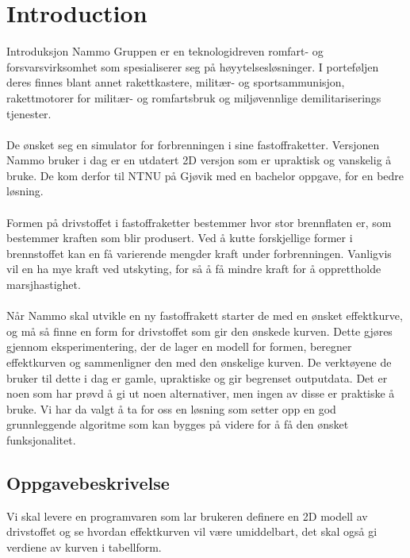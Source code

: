 \chapter{Introduction}
\label{chap:introduksjon}

Introduksjon
Nammo Gruppen er en teknologidreven romfart- og forsvarsvirksomhet som spesialiserer seg på høyytelsesløsninger. I porteføljen deres finnes blant annet rakettkastere, militær- og sportsammunisjon, rakettmotorer for militær- og romfartsbruk og miljøvennlige demilitariserings tjenester.\\
\\De ønsket seg en simulator for forbrenningen i sine fastoffraketter. Versjonen Nammo bruker i dag er en utdatert 2D versjon som er upraktisk og vanskelig å bruke. De kom derfor til NTNU på Gjøvik med en bachelor oppgave, for en bedre løsning.\\
\\Formen på drivstoffet i fastoffraketter bestemmer hvor stor brennflaten er, som bestemmer kraften som blir produsert. Ved å kutte forskjellige former i brennstoffet kan en få varierende mengder kraft under forbrenningen. Vanligvis vil en ha mye kraft ved utskyting, for så å få mindre kraft for å opprettholde marsjhastighet.\\
\\Når Nammo skal utvikle en ny fastoffrakett starter de med en ønsket effektkurve, og må så finne en form for drivstoffet som gir den ønskede kurven. Dette gjøres gjennom eksperimentering, der de lager en modell for formen, beregner effektkurven og sammenligner den med den ønskelige kurven. De verktøyene de bruker til dette i dag er gamle, upraktiske og gir begrenset outputdata. Det er noen som har prøvd å gi ut noen alternativer, men ingen av disse er praktiske å bruke. Vi har da valgt å ta for oss en løsning som setter opp en god grunnleggende algoritme som kan bygges på videre for å få den ønsket funksjonalitet.\\


\section{Oppgavebeskrivelse}


Vi skal levere en programvaren som lar brukeren definere en 2D modell av drivstoffet og se hvordan effektkurven vil være umiddelbart, det skal også gi verdiene av kurven i tabellform.

